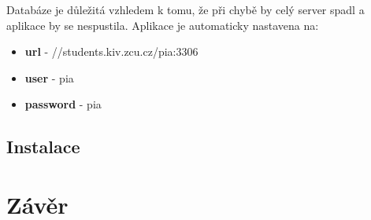 \documentclass[
12pt,
a4paper,
pdftex,
czech,
titlepage
]{report}
\begin{document}
Databáze je důležitá vzhledem k tomu, že při chybě by celý server spadl a aplikace by se nespustila. Aplikace je automaticky nastavena na:

\begin{itemize}
\item \textbf{url} - //students.kiv.zcu.cz/pia:3306
\item \textbf{user} - pia
\item \textbf{password} - pia
\end{itemize}

\section{Instalace}



\chapter{Závěr}
\end{document}
